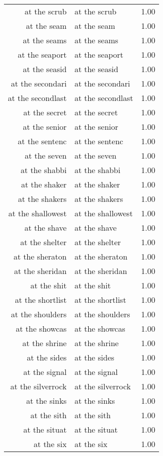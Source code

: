\begin{table}[ht]
\begin{tabular}{rlr}
  at the scrub & at the scrub & 1.00 \\ 
  at the seam & at the seam & 1.00 \\ 
  at the seams & at the seams & 1.00 \\ 
  at the seaport & at the seaport & 1.00 \\ 
  at the seasid & at the seasid & 1.00 \\ 
  at the secondari & at the secondari & 1.00 \\ 
  at the secondlast & at the secondlast & 1.00 \\ 
  at the secret & at the secret & 1.00 \\ 
  at the senior & at the senior & 1.00 \\ 
  at the sentenc & at the sentenc & 1.00 \\ 
  at the seven & at the seven & 1.00 \\ 
  at the shabbi & at the shabbi & 1.00 \\ 
  at the shaker & at the shaker & 1.00 \\ 
  at the shakers & at the shakers & 1.00 \\ 
  at the shallowest & at the shallowest & 1.00 \\ 
  at the shave & at the shave & 1.00 \\ 
  at the shelter & at the shelter & 1.00 \\ 
  at the sheraton & at the sheraton & 1.00 \\ 
  at the sheridan & at the sheridan & 1.00 \\ 
  at the shit & at the shit & 1.00 \\ 
  at the shortlist & at the shortlist & 1.00 \\ 
  at the shoulders & at the shoulders & 1.00 \\ 
  at the showcas & at the showcas & 1.00 \\ 
  at the shrine & at the shrine & 1.00 \\ 
  at the sides & at the sides & 1.00 \\ 
  at the signal & at the signal & 1.00 \\ 
  at the silverrock & at the silverrock & 1.00 \\ 
  at the sinks & at the sinks & 1.00 \\ 
  at the sith & at the sith & 1.00 \\ 
  at the situat & at the situat & 1.00 \\ 
  at the six & at the six & 1.00 \\ 

\end{tabular}
\end{table}
